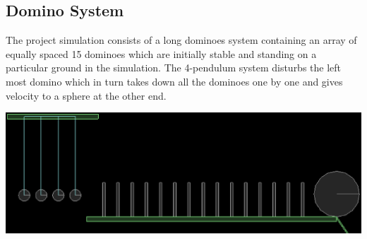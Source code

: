 \documentclass[11pt]{article}
\begin{document}
\subsection{Domino System}
The project simulation consists of a long dominoes system containing an array of equally spaced 15 dominoes which are initially stable and standing on a particular ground in the simulation. The 4-pendulum system disturbs the left most domino which in turn takes down all the dominoes one by one and gives velocity to a sphere at the other end.
\begin{center}
\includegraphics[scale=0.5]{domino}
\end{center}
\end{document}

